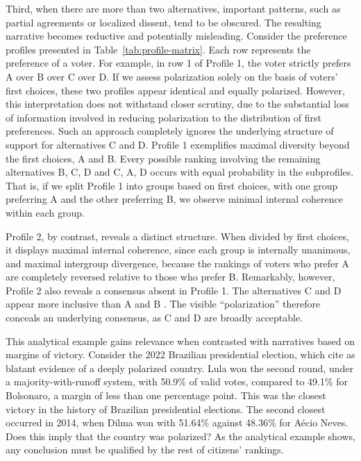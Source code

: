 \documentclass[12pt]{article}
\begin{document}
Third, when there are more than two alternatives, important patterns, such as partial agreements or localized dissent, tend to be obscured. The resulting narrative becomes reductive and potentially misleading. Consider the preference profiles presented in Table~\ref{tab:profile-matrix}. Each row represents the preference of a voter. For example, in row 1 of Profile 1, the voter strictly prefers A over B over C over D. If we assess polarization solely on the basis of voters’ first choices, these two profiles appear identical and equally polarized. However, this interpretation does not withstand closer scrutiny, due to the substantial loss of information involved in reducing polarization to the distribution of first preferences. Such an approach completely ignores the underlying structure of support for alternatives C and D. Profile 1 exemplifies maximal diversity beyond the first choices, A and B. Every possible ranking involving the remaining alternatives B, C, D and C, A, D occurs with equal probability in the subprofiles. That is, if we split Profile 1 into groups based on first choices, with one group preferring A and the other preferring B, we observe minimal internal coherence within each group.

Profile 2, by contrast, reveals a distinct structure. When divided by first choices, it displays maximal internal coherence, since each group is internally unanimous, and maximal intergroup divergence, because the rankings of voters who prefer A are completely reversed relative to those who prefer B. Remarkably, however, Profile 2 also reveals a consensus absent in Profile 1. The alternatives C and D appear more inclusive than A and B \parencite{igersheim22_compar_votin_method}. The visible “polarization” therefore conceals an underlying consensus, as C and D are broadly acceptable.

This analytical example gains relevance when contrasted with narratives based on margins of victory. Consider the 2022 Brazilian presidential election, which \textcite{nunes2023biografia} cite as blatant evidence of a deeply polarized country. Lula won the second round, under a majority-with-runoff system, with 50.9\% of valid votes, compared to 49.1\% for Bolsonaro, a margin of less than one percentage point. This was the closest victory in the history of Brazilian presidential elections. The second closest occurred in 2014, when Dilma won with 51.64\% against 48.36\% for Aécio Neves. Does this imply that the country was polarized? As the analytical example shows, any conclusion must be qualified by the rest of citizens’ rankings.
\end{document}
